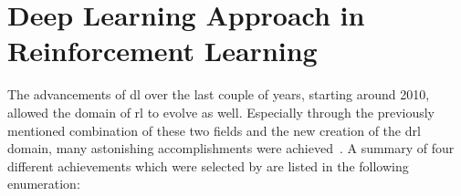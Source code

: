 \documentclass[draft,final]{vutinfth} %
\newcommand{\p}[1]{see p. #1}
\begin{document}



    \section{Deep Learning Approach in Reinforcement Learning}
    The advancements of \gls{dl} over the last couple of years, starting around 2010, allowed the domain of \gls{rl} to evolve as well.
    Especially through the previously mentioned combination of these two fields and the new creation of the \gls{drl} domain, many astonishing accomplishments were achieved~\citep{francois-lavet_introduction_2018}.
    A summary of four different achievements which were selected by \citet[\p{374}]{aggarwal_neural_2018} are listed in the following enumeration:
\end{document}
